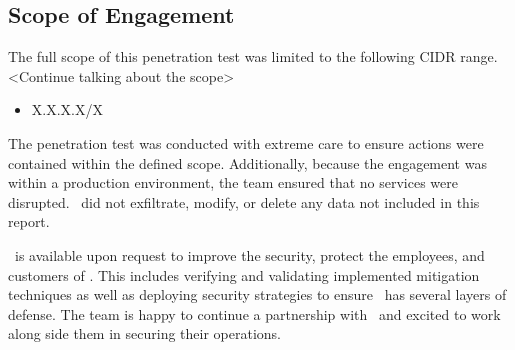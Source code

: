 \subsection{Scope of Engagement}
    The full scope of this penetration test was limited to the following CIDR range.  <Continue talking about the scope>
    
    \begin{itemize}
        \item X.X.X.X/X 
    \end{itemize}

    The penetration test was conducted with extreme care to ensure actions were contained within the defined scope. Additionally, because the engagement was within a production environment, the team ensured that no services were disrupted. \teamname\ did not exfiltrate, modify, or delete any data not included in this report. 

    \teamname\ is available upon request to improve the security, protect the employees, and customers of \cptc. This includes verifying and validating implemented mitigation techniques as well as deploying security strategies to ensure \cptc\ has several layers of defense. The team is happy to continue a partnership with \cptc\ and excited to work along side them in securing their operations. 